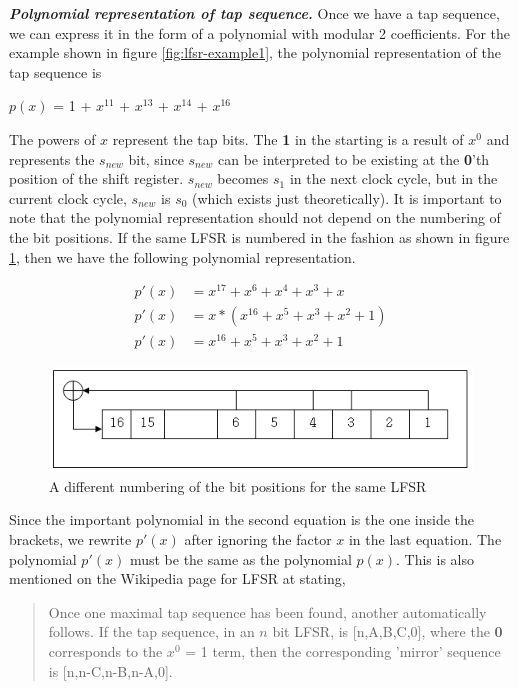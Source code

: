 \noindent \textit{\textbf{Polynomial representation of tap sequence.}} Once we have a tap sequence, we can express it in the form of a polynomial with modular 2 coefficients. For the example shown in figure \ref{fig:lfsr-example1}, the polynomial representation of the tap sequence is

\begin{center}
$p(x)$ =  1 + $x^{11}$ + $x^{13}$ + $x^{14}$ + $x^{16}$
\end{center}

The powers of $x$ represent the tap bits. The \textbf{1} in the starting is a result of $x^0$ and represents the $s_{new}$ bit, since $s_{new}$ can be interpreted to be existing at the \textbf{0}'th position of the shift register. $s_{new}$ becomes $s_1$ in the next clock cycle, but in the current clock cycle, $s_{new}$ is $s_0$ (which exists just theoretically). It is important to note that the polynomial representation should not depend on the numbering of the bit positions. If the same LFSR is numbered in the fashion as shown in figure \ref{fig:lfsr-example2}, then we have the following polynomial representation.

\begin{align*}
p'(x) &= x^{17} + x^{6} + x^{4} + x^{3} + x\\
p'(x) &= x*(x^{16} + x^{5} + x^{3} + x^{2} + 1)\\
p'(x) &= x^{16} + x^{5} + x^{3} + x^{2} + 1
\end{align*}

\begin{figure}[ht!]
	\centering
		\includegraphics[width=5in]{./figures/lfsr-example-reverse.PNG}
	\caption{A different numbering of the bit positions for the same LFSR}	
	\label{fig:lfsr-example2}
\end{figure}

Since the important polynomial in the second equation is the one inside the brackets, we rewrite $p'(x)$ after ignoring the factor $x$ in the last equation. The polynomial $p'(x)$ must be the same as the polynomial $p(x)$. This is also mentioned on the Wikipedia page for LFSR at \cite{lfsr-wiki} stating,

\begin{quote}
Once one maximal tap sequence has been found, another automatically follows. If the tap sequence, in an $n$ bit LFSR, is [n,A,B,C,0], where the \textbf{0} corresponds to the $x^0$ = 1 term, then the corresponding 'mirror' sequence is [n,n-C,n-B,n-A,0].
\end{quote}

